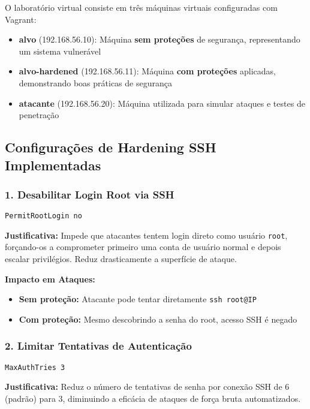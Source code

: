 \documentclass[12pt]{article}
\begin{document}
O laboratório virtual consiste em três máquinas virtuais configuradas com Vagrant:
\begin{itemize}
    \item \textbf{alvo} (192.168.56.10): Máquina \textbf{sem proteções} de segurança, representando um sistema vulnerável
    \item \textbf{alvo-hardened} (192.168.56.11): Máquina \textbf{com proteções} aplicadas, demonstrando boas práticas de segurança
    \item \textbf{atacante} (192.168.56.20): Máquina utilizada para simular ataques e testes de penetração
\end{itemize}

\subsection{Configurações de Hardening SSH Implementadas}

\subsubsection{1. Desabilitar Login Root via SSH}
\begin{verbatim}
PermitRootLogin no
\end{verbatim}

\textbf{Justificativa:} Impede que atacantes tentem login direto como usuário \texttt{root}, forçando-os a comprometer primeiro uma conta de usuário normal e depois escalar privilégios. Reduz drasticamente a superfície de ataque.

\textbf{Impacto em Ataques:}
\begin{itemize}
    \item \textbf{Sem proteção:} Atacante pode tentar diretamente \texttt{ssh root@IP}
    \item \textbf{Com proteção:} Mesmo descobrindo a senha do root, acesso SSH é negado
\end{itemize}

\subsubsection{2. Limitar Tentativas de Autenticação}
\begin{verbatim}
MaxAuthTries 3
\end{verbatim}

\textbf{Justificativa:} Reduz o número de tentativas de senha por conexão SSH de 6 (padrão) para 3, diminuindo a eficácia de ataques de força bruta automatizados.
\end{document}
